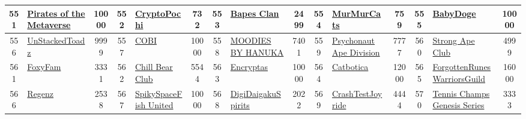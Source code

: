 \begin{table*}[]
{\begin{tabular}{|c|l|c|c|l|c|c|l|c|c|l|c|c|l|c|}
        551   & \href{http://piratesnft.io}{Pirates of the Metaverse}                              & 10000             & 552   & \href{https://pochi.club}{CryptoPochi}                                                            & 732               & 553   & \href{https://bapesnetwork.com}{Bapes Clan}                                       & 2499              & 554   & \href{https://murmurcats.club/}{MurMurCats}                                   & 759               & 555   & \href{http://babydogenft.com}{BabyDoge}                                                   & 10000                                   \\ \hline
        556   & \href{https://www.stackedtoads.xyz/}{UnStackedToadz}                               & 9999              & 557   & \href{https://bullieverse.com/}{COBI}                                                             & 10000             & 558   & \href{https://www.moodiesbyhanuka.com}{MOODIES BY HANUKA}                         & 7401              & 559   & \href{https://www.psychonautapedivision.com/}{Psychonaut Ape Division}        & 7777              & 560   & \href{https://strongapeclub.com}{Strong Ape Club}                                         & 4999                                    \\ \hline
        561   & \href{http://foxyfam.io}{FoxyFam}                                                  & 3331              & 562   & \href{https://www.chillbear.club/}{Chill Bear Club}                                               & 5544              & 563   & \href{http://cypherchk.com}{Encryptas}                                            & 10000             & 564   & \href{https://catbotica.com}{Catbotica}                                       & 12000             & 565   & \href{https://forgottenrunes.com}{ForgottenRunesWarriorsGuild}                            & 16000                                   \\ \hline
        566   & \href{http://degenz.co}{Regenz}                                                    & 2538              & 567   & \href{https://www.spikyspacefish.com/home}{SpikySpaceFish United}                                 & 10000             & 568   & \href{https://digidaigaku.com/spirits}{DigiDaigakuSpirits}                        & 2022              & 569   & \href{https://crashtestjoyride.com}{CrashTestJoyride}                         & 4444              & 570   & \href{https://www.onjoyride.com/genesis-nft}{Tennis Champs Genesis Series}                & 3333                                    \\ \hline

\end{tabular}}
\end{table*}

